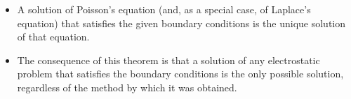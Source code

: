 \ELhold


\begin{ELunit}


\begin{itemize}
\tightlist
\item
  A solution of Poisson's equation (and, as a special case, of Laplace's equation) that satisfies the given boundary conditions is the unique solution of that equation.
\item
  The consequence of this theorem is that a solution of any electrostatic problem that satisfies the boundary conditions is the only possible solution, regardless of the method by which it was obtained.
\end{itemize}

\end{ELunit}

\ELhold


